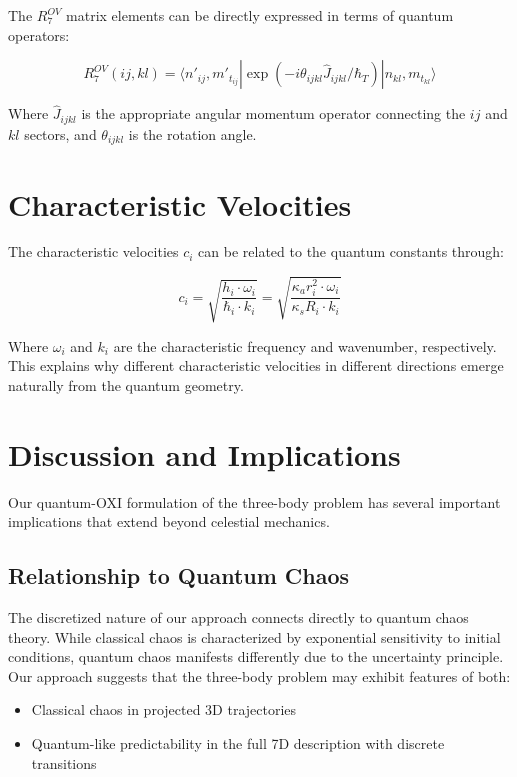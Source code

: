 \documentclass{article}
\begin{document}
The $R^{OV}_7$ matrix elements can be directly expressed in terms of quantum operators:

\begin{equation}
R^{OV}_7(ij,kl) = \langle n'_{ij}, m'_{t_{ij}}|\exp(-i\theta_{ijkl} \hat{J}_{ijkl}/\hbar_T)|n_{kl}, m_{t_{kl}}\rangle
\end{equation}

Where $\hat{J}_{ijkl}$ is the appropriate angular momentum operator connecting the $ij$ and $kl$ sectors, and $\theta_{ijkl}$ is the rotation angle.

\section{Characteristic Velocities}

The characteristic velocities $c_i$ can be related to the quantum constants through:

\begin{equation}
c_i = \sqrt{\frac{h_i \cdot \omega_i}{\hbar_i \cdot k_i}} = \sqrt{\frac{\kappa_a r_i^2 \cdot \omega_i}{\kappa_s R_i \cdot k_i}}
\end{equation}

Where $\omega_i$ and $k_i$ are the characteristic frequency and wavenumber, respectively. This explains why different characteristic velocities in different directions emerge naturally from the quantum geometry.

\section{Discussion and Implications}

Our quantum-OXI formulation of the three-body problem has several important implications that extend beyond celestial mechanics.

\subsection{Relationship to Quantum Chaos}

The discretized nature of our approach connects directly to quantum chaos theory. While classical chaos is characterized by exponential sensitivity to initial conditions, quantum chaos manifests differently due to the uncertainty principle. Our approach suggests that the three-body problem may exhibit features of both:
\begin{itemize}
\item Classical chaos in projected 3D trajectories
\item Quantum-like predictability in the full 7D description with discrete transitions
\end{itemize}
\end{document}
